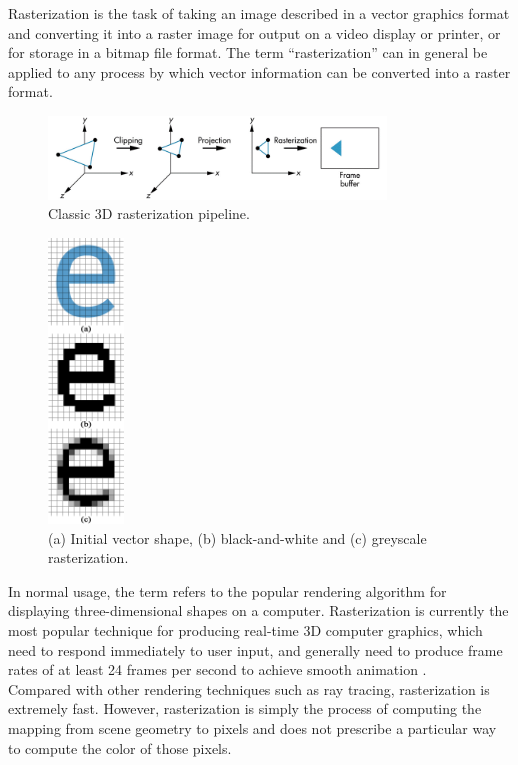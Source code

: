 \documentclass[]{usiinfbachelorproject}
\begin{document}
Rasterization is the task of taking an image described in a vector graphics format and converting it into a raster image for output on a video display or printer, or for storage in a bitmap file format. The term ``rasterization'' can in general be applied to any process by which vector information can be converted into a raster format.
\begin{figure} [ht]
	\centering
	\includegraphics[width=0.8\textwidth]{img/pipeline.png}
	\caption{Classic 3D rasterization pipeline.}
	\label{fig:pipeline}
\end{figure}
\begin{figure}
	\centering
	\includegraphics[width=0.18\textwidth]{img/raster.png}
	\caption{(a) Initial vector shape, (b) black-and-white and (c) greyscale rasterization.}
	\label{fig:rasterization}
\end{figure}
In normal usage, the term refers to the popular rendering algorithm for displaying three-dimensional shapes on a computer. Rasterization is currently the most popular technique for producing real-time 3D computer graphics, which need to respond immediately to user input, and generally need to produce frame rates of at least 24 frames per second to achieve smooth animation \cite{Wiki:rasterization}.\\
Compared with other rendering techniques such as ray tracing, rasterization is extremely fast. However, rasterization is simply the process of computing the mapping from scene geometry to pixels and does not prescribe a particular way to compute the color of those pixels.\\
\end{document}
